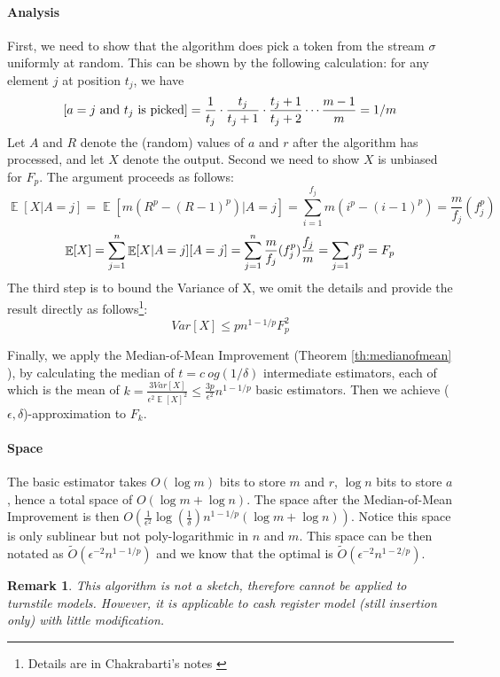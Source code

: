 \documentclass[11pt]{article}
\theoremstyle{plain}
\newtheorem{remark}[theorem]{Remark}
\DeclareMathOperator*{\E}{\mathbb{E}}
\let\Pr\relax
\DeclareMathOperator*{\Pr}{\mathbb{P}}
\begin{document}
\paragraph{Analysis}
First, we need to show that the algorithm does pick a token from the stream 
$\sigma$ uniformly at random. This can be shown by the following calculation: 
for any element $j$ at position $t_j$, we have \[
\Pr[a=j \text{ and } t_j \text{ is picked}]
=\frac{1}{t_j}\cdot\frac{t_j}{t_j+1}\cdot\frac{t_j+1}{t_j+2}\cdots\frac{m-1}{m} =1/m
\]
Let $A$ and $R$ denote the (random) values of $a$ and $r$ after the algorithm 
has processed, and let $X$ denote the output. Second we need to show $X$ is 
unbiased for $F_p$. The argument proceeds as follows:
\[
\E[X|A=j]=\E[m(R^p-(R-1)^p)|A=j]=\sum_{i=1}^{f_j} 
m(i^p-(i-1)^p)=\frac{m}{f_j}(f_j^p)
\]
\[
\E[X]=\sum_{j=1}^n \E[X|A=j]\Pr[A=j]=\sum_{j=1}^n 
\frac{m}{f_j}(f_j^p)\frac{f_j}{m}=\sum_{j=1}f_j^p=F_p
\]
The third step is to bound the Variance of X, we omit the details and provide the 
result directly as follows\footnote{Details are in Chakrabarti's notes 
\cite{Cha2015-notes}}:
\[
Var[X]\leq pn^{1-1/p}F_p^2
\]

Finally, we apply the Median-of-Mean Improvement (Theorem 
\ref{th:medianofmean} ), by calculating the median of $t=c\ og(1/\delta)$ 
intermediate estimators, each of which is the mean of 
$k=\frac{3Var[X]}{\epsilon^2\E[X]^2}\leq\frac{3p}{\epsilon^2}n^{1-1/p}$ basic 
estimators. Then we achieve ($\epsilon, \delta$)-approximation to $F_k$. 

\paragraph{Space}
The basic estimator takes $O(\log m)$ bits to store $m$ and $r$, $\log n $ bits 
to store $a$, hence a total space of $O(\log m +\log n)$. The space after the 
Median-of-Mean Improvement is then $O(\frac{1}{\epsilon^2}\log(
\frac{1}{\delta})n^{1-1/p}(\log m+ \log n))$. Notice this space is only sublinear 
but not poly-logarithmic in $n$ and $m$. This space can be then notated as 
$\tilde{O}(\epsilon^{-2}n^{1-1/p})$ and we know that the optimal is 
$\tilde{O}(\epsilon^{-2}n^{1-2/p})$. 

\begin{remark}
This algorithm is not a sketch, therefore cannot be applied to turnstile models. 
However, it is applicable to cash register model (still insertion only) with little 
modification. 
\end{remark}
\end{document}
